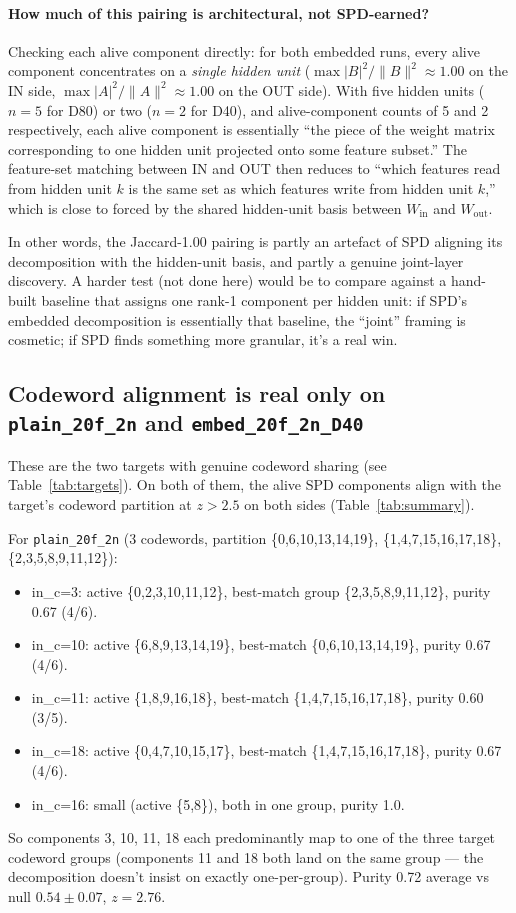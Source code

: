 \documentclass[11pt]{article}
\newcommand{\Wein}{W_{\mathrm{in}}}
\newcommand{\Weout}{W_{\mathrm{out}}}
\begin{document}
\paragraph{How much of this pairing is architectural, not SPD-earned?}
Checking each alive component directly: for both embedded runs, every
alive component concentrates on a \emph{single hidden unit}
($\max|B|^2/\|B\|^2 \approx 1.00$ on the IN side,
$\max|A|^2/\|A\|^2 \approx 1.00$ on the OUT side). With five hidden
units ($n=5$ for D80) or two ($n=2$ for D40), and alive-component
counts of 5 and 2 respectively, each alive component is essentially
``the piece of the weight matrix corresponding to one hidden unit
projected onto some feature subset.'' The feature-set matching between
IN and OUT then reduces to ``which features read from hidden unit $k$
is the same set as which features write from hidden unit $k$,'' which is
close to forced by the shared hidden-unit basis between $\Wein$ and
$\Weout$.

In other words, the Jaccard-1.00 pairing is partly an artefact of SPD
aligning its decomposition with the hidden-unit basis, and partly a
genuine joint-layer discovery. A harder test (not done here) would be
to compare against a hand-built baseline that assigns one rank-1
component per hidden unit: if SPD's embedded decomposition is
essentially that baseline, the ``joint'' framing is cosmetic; if SPD
finds something more granular, it's a real win.

\subsection{Codeword alignment is real only on \texttt{plain\_20f\_2n} and \texttt{embed\_20f\_2n\_D40}}

These are the two targets with genuine codeword sharing (see
Table~\ref{tab:targets}). On both of them, the alive SPD components
align with the target's codeword partition at $z > 2.5$ on both sides
(Table~\ref{tab:summary}).

For \texttt{plain\_20f\_2n} (3 codewords, partition
\{0,6,10,13,14,19\}, \{1,4,7,15,16,17,18\}, \{2,3,5,8,9,11,12\}):
\begin{itemize}
\item in\_c=3: active \{0,2,3,10,11,12\}, best-match group
  \{2,3,5,8,9,11,12\}, purity 0.67 (4/6).
\item in\_c=10: active \{6,8,9,13,14,19\}, best-match
  \{0,6,10,13,14,19\}, purity 0.67 (4/6).
\item in\_c=11: active \{1,8,9,16,18\}, best-match
  \{1,4,7,15,16,17,18\}, purity 0.60 (3/5).
\item in\_c=18: active \{0,4,7,10,15,17\}, best-match
  \{1,4,7,15,16,17,18\}, purity 0.67 (4/6).
\item in\_c=16: small (active \{5,8\}), both in one group, purity 1.0.
\end{itemize}
So components 3, 10, 11, 18 each predominantly map to one of the three
target codeword groups (components 11 and 18 both land on the same
group — the decomposition doesn't insist on exactly one-per-group).
Purity 0.72 average vs null $0.54 \pm 0.07$, $z = 2.76$.
\end{document}
